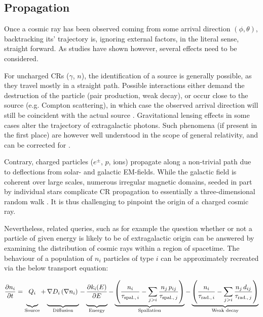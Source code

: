 \subsection{Propagation}
\label{ssec:cr-propagation}

Once a cosmic ray has been observed coming from some arrival direction $(\phi, \theta)$, backtracking its' trajectory is, ignoring external factors, in the literal 
sense, straight forward. As studies have shown however, several effects need to be considered. 

For uncharged CRs ($\gamma$, $n$), the identification of a source is generally possible, as they travel mostly in a straight path. Possible interactions either 
demand the destruction of the particle (pair production, weak decay), or occur close to the source (e.g. Compton scattering), in which case the observed arrival 
direction will still be coincident with the actual source \cite{fermi201398}. Gravitational lensing effects in some cases alter the trajectory of extragalactic 
photons. Such phenomena (if present in the first place) are however well understood in the scope of general relativity, and can be corrected for 
\cite{bartelmann2010gravitational, bartelmann2001weak}.

Contrary, charged particles ($e^\pm$, $p$, ions) propagate along a non-trivial path due to deflections from solar- and galactic EM-fields. While the galactic field 
is coherent over large scales, numerous irregular magnetic domains, seeded in part by individual stars complicate CR propagation to essentially a three-dimensional 
random walk \cite{haverkorn2015magnetic}. It is thus challenging to pinpoint the origin of a charged cosmic ray. 

Nevertheless, related queries, such as for example the question whether or not a particle of given energy is likely to be of extragalactic origin can be answered by
examining the distribution of cosmic rays within a region of spacetime. The behaviour of a population of $n_i$ particles of type $i$ can be approximately recreated 
via the below transport equation:

\begin{equation*}
\label{eq:leaky-box-model}
\frac{\partial n_i}{\partial t} =   \underbrace{Q_i \vphantom{\left(\sum\limits_{j>i}\frac{p_{ij}}{\tau_{\text{spal.},\,j}} n_j\right)}}_\text{Source} 
 								  + \underbrace{\nabla D_i \left( \nabla n_i \right) \vphantom{\left(\sum\limits_{j>i}\frac{p_{ij}}{\tau_{\text{spal.},\,j}} n_j\right)}}_\text{Diffusion} 
								  - \underbrace{\frac{\partial k_i(E)}{\partial E} \vphantom{\left(\sum\limits_{j>i}\frac{p_{ij}}{\tau_{\text{spal.},\,j}} n_j\right)}}_\text{Energy} 
								  - \underbrace{\left( \frac{n_i}{\tau_{\text{spal.},\,i}} - \sum\limits_{j>i} \frac{n_j\,p_{ij}}{\tau_{\text{spal.},\,j}} \right)}_\text{Spallation}
								  - \underbrace{\left( \frac{n_i}{\tau_{\text{rad.},\,i}} - \sum\limits_{j>i} \frac{ n_j\,d_{ij}}{\tau_{\text{rad.},\,j}} \right)}_\text{Weak decay}
\end{equation*}

